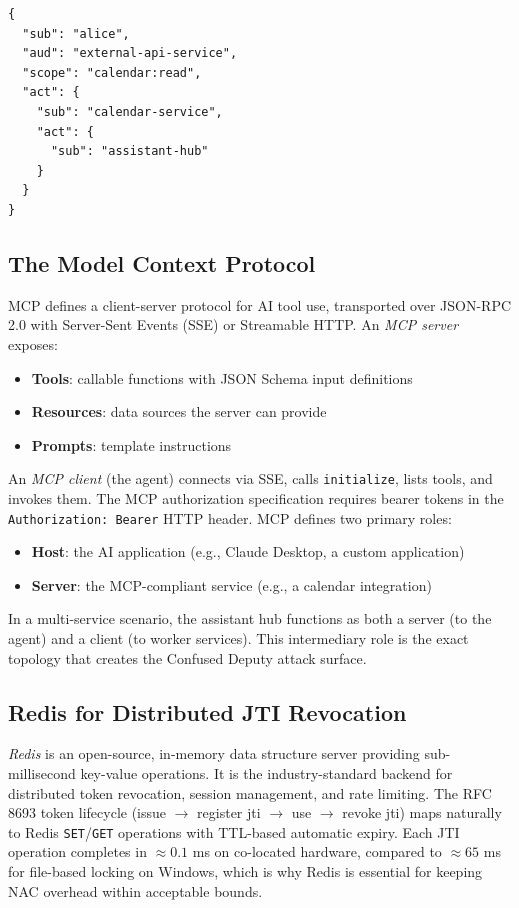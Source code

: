 \documentclass[journal]{IEEEtran}
\begin{document}
\begin{lstlisting}[language={},caption={Nested act claim for 3-hop delegation},
                   label={lst:actchain}]
{
  "sub": "alice",
  "aud": "external-api-service",
  "scope": "calendar:read",
  "act": {
    "sub": "calendar-service",
    "act": {
      "sub": "assistant-hub"
    }
  }
}
\end{lstlisting}

\subsection{The Model Context Protocol}

MCP \cite{mcp_spec} defines a client-server protocol for AI tool use, transported over JSON-RPC 2.0 with Server-Sent Events (SSE) or Streamable HTTP. An \textit{MCP server} exposes:
\begin{itemize}
  \item \textbf{Tools}: callable functions with JSON Schema input definitions
  \item \textbf{Resources}: data sources the server can provide
  \item \textbf{Prompts}: template instructions
\end{itemize}

An \textit{MCP client} (the agent) connects via SSE, calls \texttt{initialize}, lists tools, and invokes them. The MCP authorization specification requires bearer tokens in the \texttt{Authorization: Bearer} HTTP header. MCP defines two primary roles:
\begin{itemize}
  \item \textbf{Host}: the AI application (e.g., Claude Desktop, a custom application)
  \item \textbf{Server}: the MCP-compliant service (e.g., a calendar integration)
\end{itemize}

In a multi-service scenario, the assistant hub functions as both a server (to the agent) and a client (to worker services). This intermediary role is the exact topology that creates the Confused Deputy attack surface.

\subsection{Redis for Distributed JTI Revocation}

\textit{Redis} \cite{redis} is an open-source, in-memory data structure server providing sub-millisecond key-value operations. It is the industry-standard backend for distributed token revocation, session management, and rate limiting. The RFC 8693 token lifecycle (issue $\to$ register jti $\to$ use $\to$ revoke jti) maps naturally to Redis \texttt{SET}/\texttt{GET} operations with TTL-based automatic expiry. Each JTI operation completes in $\approx 0.1$ ms on co-located hardware, compared to $\approx 65$ ms for file-based locking on Windows, which is why Redis is essential for keeping NAC overhead within acceptable bounds.
\end{document}
